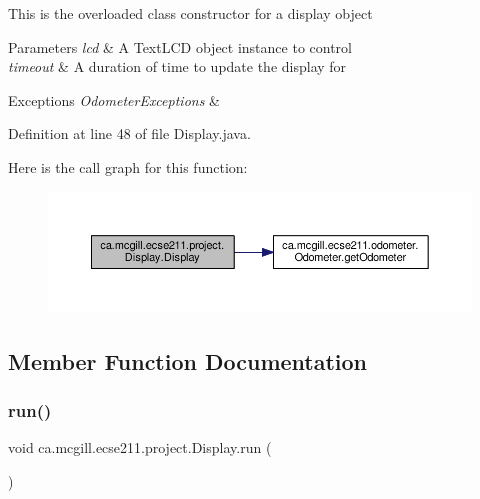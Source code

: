 This is the overloaded class constructor for a display object


\begin{DoxyParams}{Parameters}
{\em lcd} & A Text\+L\+CD object instance to control \\
\hline
{\em timeout} & A duration of time to update the display for \\
\hline
\end{DoxyParams}

\begin{DoxyExceptions}{Exceptions}
{\em Odometer\+Exceptions} & \\
\hline
\end{DoxyExceptions}


Definition at line 48 of file Display.\+java.

Here is the call graph for this function\+:
\nopagebreak
\begin{figure}[H]
\begin{center}
\leavevmode
\includegraphics[width=350pt]{classca_1_1mcgill_1_1ecse211_1_1project_1_1_display_a690cd91bcc8024950c2b8e3b2613c801_cgraph}
\end{center}
\end{figure}


\subsection{Member Function Documentation}
\mbox{\label{classca_1_1mcgill_1_1ecse211_1_1project_1_1_display_ab508a8bc2b738499bec2c432a814cba5}} 
\subsubsection{\texorpdfstring{run()}{run()}}
{\footnotesize\ttfamily void ca.\+mcgill.\+ecse211.\+project.\+Display.\+run (\begin{DoxyParamCaption}{ }\end{DoxyParamCaption})}

